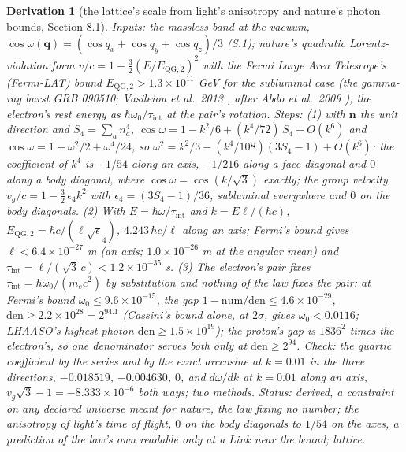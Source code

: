 \documentclass[pdflatex,sn-mathphys-num]{sn-jnl}
\newcommand{\num}{\mathrm{num}}
\newcommand{\den}{\mathrm{den}}
\theoremstyle{thmstyleone}
\newtheorem{derivation}{Derivation}
\begin{document}
\begin{derivation}[the lattice's scale from light's anisotropy and nature's photon bounds, Section 8.1]
\emph{Inputs:} the massless band at the vacuum, $\cos\omega(\mathbf q) = (\cos q_x + \cos q_y + \cos q_z) / 3$ (S.1); nature's quadratic Lorentz-violation form $v / c = 1 - \tfrac32 (E / E_{\mathrm{QG},2})^2$ with the Fermi Large Area Telescope's (Fermi-LAT) bound $E_{\mathrm{QG},2} > 1.3 \times 10^{11}$ GeV for the subluminal case (the gamma-ray burst GRB 090510; Vasileiou et al.\ 2013 \cite{vasileiou}, after Abdo et al.\ 2009 \cite{fermi_lat}); the electron's rest energy as $\hbar\omega_0 / \tau_{\mathrm{int}}$ at the pair's rotation. \emph{Steps:} (1) with $\mathbf n$ the unit direction and $S_4 = \sum_a n_a^4$, $\cos\omega = 1 - k^2 / 6 + (k^4 / 72)\,S_4 + O(k^6)$ and $\cos\omega = 1 - \omega^2 / 2 + \omega^4 / 24$, so $\omega^2 = k^2 / 3 - (k^4 / 108)(3S_4 - 1) + O(k^6)$: the coefficient of $k^4$ is $-1 / 54$ along an axis, $-1 / 216$ along a face diagonal and $0$ along a body diagonal, where $\cos\omega = \cos(k / \sqrt 3)$ exactly; the group velocity $v_g / c = 1 - \tfrac32\,\epsilon_4 k^2$ with $\epsilon_4 = (3S_4 - 1) / 36$, subluminal everywhere and $0$ on the body diagonals. (2) With $E = \hbar\omega / \tau_{\mathrm{int}}$ and $k = E\ell / (\hbar c)$, $E_{\mathrm{QG},2} = \hbar c / (\ell\sqrt\epsilon_4)$, $4.243\,\hbar c / \ell$ along an axis; Fermi's bound \cite{vasileiou} gives $\ell < 6.4 \times 10^{-27}$ m (an axis; $1.0 \times 10^{-26}$ m at the angular mean) and $\tau_{\mathrm{int}} = \ell / (\sqrt 3\,c) < 1.2 \times 10^{-35}$ s. (3) The electron's pair fixes $\tau_{\mathrm{int}} = \hbar\omega_0 / (m_e c^2)$ by substitution and nothing of the law fixes the pair: at Fermi's bound $\omega_0 \le 9.6 \times 10^{-15}$, the gap $1 - \num / \den \le 4.6 \times 10^{-29}$, $\den \ge 2.2 \times 10^{28} = 2^{94.1}$ (Cassini's bound alone, at $2\sigma$, gives $\omega_0 < 0.0116$; LHAASO's highest photon $\den \ge 1.5 \times 10^{19}$); the proton's gap is $1836^2$ times the electron's, so one denominator serves both only at $\den \ge 2^{94}$. \emph{Check:} the quartic coefficient by the series and by the exact arccosine at $k = 0.01$ in the three directions, $-0.018519$, $-0.004630$, $0$, and $d\omega / dk$ at $k = 0.01$ along an axis, $v_g\sqrt 3 - 1 = -8.333 \times 10^{-6}$ both ways; two methods. \emph{Status:} derived, a constraint on any declared universe meant for nature, the law fixing no number; the anisotropy of light's time of flight, $0$ on the body diagonals to $1 / 54$ on the axes, a prediction of the law's own readable only at a Link near the bound; lattice.
\end{derivation}
\end{document}
